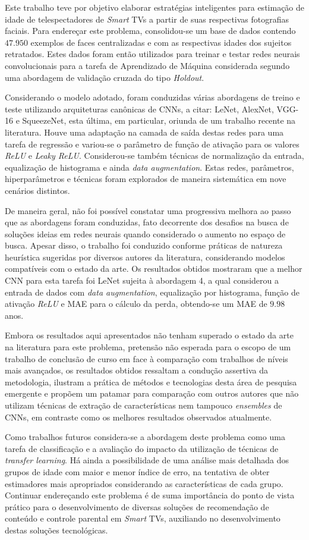 Este trabalho teve por objetivo elaborar estratégias inteligentes para estimação de idade de telespectadores de  \emph{Smart} TVs a partir de suas respectivas fotografias faciais. Para endereçar este problema, consolidou-se um base de dados contendo $47.950$ exemplos de faces centralizadas e com as respectivas idades dos sujeitos retratados. Estes dados foram então utilizados para treinar e testar redes neurais convolucionais para a tarefa de Aprendizado de Máquina considerada segundo uma abordagem de validação cruzada do tipo \emph{Holdout}.

Considerando o modelo adotado, foram conduzidas várias abordagens de treino e teste utilizando arquiteturas canônicas de CNNs, a citar: LeNet, AlexNet, VGG-16 e SqueezeNet, esta última, em particular, oriunda de um trabalho recente na literatura. Houve uma adaptação na camada de saída destas redes para uma tarefa de regressão e variou-se o parâmetro de função de ativação para os valores \emph{ReLU} e \emph{Leaky ReLU}. Considerou-se também técnicas de normalização da entrada, equalização de histograma e ainda \emph{data augmentation}. Estas redes, parâmetros, hiperparâmetros e técnicas foram explorados de maneira sistemática em nove cenários distintos.

De maneira geral, não foi possível constatar uma progressiva melhora ao passo que as abordagens foram conduzidas, fato decorrente dos desafios na busca de soluções ideias em redes neurais quando considerado o aumento no espaço de busca. Apesar disso, o trabalho foi conduzido conforme práticas de natureza heurística sugeridas por diversos autores da literatura, considerando modelos compatíveis com o estado da arte. Os resultados obtidos mostraram que a melhor CNN para esta tarefa foi LeNet sujeita à abordagem 4, a qual considerou a entrada de dados com \emph{data augmentation}, equalização por histograma, função de ativação \emph{ReLU} e MAE para o cálculo da perda, obtendo-se um MAE de $9.98$ anos. 

Embora os resultados aqui apresentados não tenham superado o estado da arte na literatura para este problema, pretensão não esperada para o escopo de um trabalho de conclusão de curso em face à comparação com trabalhos de níveis mais avançados, os resultados obtidos ressaltam a condução assertiva da metodologia, ilustram a prática de métodos e tecnologias desta área de pesquisa emergente e propõem um patamar para comparação com outros autores que não utilizam técnicas de extração de características nem tampouco \emph{ensembles} de CNNs, em contraste como os melhores resultados observados atualmente.

Como trabalhos futuros considera-se a abordagem deste problema como uma tarefa de classificação e a avaliação do impacto da utilização de técnicas de \emph{transfer learning}. Há ainda a possibilidade de uma análise mais detalhada dos grupos de idade com maior e menor índice de erro, na tentativa de obter estimadores mais apropriados considerando as características de cada grupo.  Continuar endereçando este problema é de suma importância do ponto de vista prático para o desenvolvimento de diversas soluções de recomendação de conteúdo e controle parental em \emph{Smart} TVs, auxiliando no desenvolvimento destas soluções tecnológicas.
